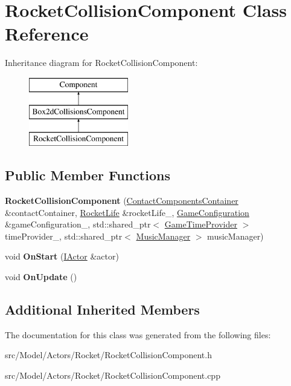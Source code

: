 \hypertarget{classRocketCollisionComponent}{}\section{Rocket\+Collision\+Component Class Reference}
\label{classRocketCollisionComponent}
Inheritance diagram for Rocket\+Collision\+Component\+:\begin{figure}[H]
\begin{center}
\leavevmode
\includegraphics[height=3.000000cm]{classRocketCollisionComponent}
\end{center}
\end{figure}
\subsection*{Public Member Functions}
\begin{DoxyCompactItemize}
\item 
{\bfseries Rocket\+Collision\+Component} (\hyperlink{classContactComponentsContainer}{Contact\+Components\+Container} \&contact\+Container, \hyperlink{classRocketLife}{Rocket\+Life} \&rocket\+Life\+\_\+, \hyperlink{classGameConfiguration}{Game\+Configuration} \&game\+Configuration\+\_\+, std\+::shared\+\_\+ptr$<$ \hyperlink{classGameTimeProvider}{Game\+Time\+Provider} $>$ time\+Provider\+\_\+, std\+::shared\+\_\+ptr$<$ \hyperlink{classMusicManager}{Music\+Manager} $>$ music\+Manager)\hypertarget{classRocketCollisionComponent_a6e6b16f0bdebd61d61419e6489aaaa1d}{}\label{classRocketCollisionComponent_a6e6b16f0bdebd61d61419e6489aaaa1d}

\item 
void {\bfseries On\+Start} (\hyperlink{classIActor}{I\+Actor} \&actor)\hypertarget{classRocketCollisionComponent_ac7047bfdd65e477486914bacd46b2ef4}{}\label{classRocketCollisionComponent_ac7047bfdd65e477486914bacd46b2ef4}

\item 
void {\bfseries On\+Update} ()\hypertarget{classRocketCollisionComponent_a78da82655a8c221f89bd3ea0816ecf5f}{}\label{classRocketCollisionComponent_a78da82655a8c221f89bd3ea0816ecf5f}

\end{DoxyCompactItemize}
\subsection*{Additional Inherited Members}


The documentation for this class was generated from the following files\+:\begin{DoxyCompactItemize}
\item 
src/\+Model/\+Actors/\+Rocket/Rocket\+Collision\+Component.\+h\item 
src/\+Model/\+Actors/\+Rocket/Rocket\+Collision\+Component.\+cpp\end{DoxyCompactItemize}
